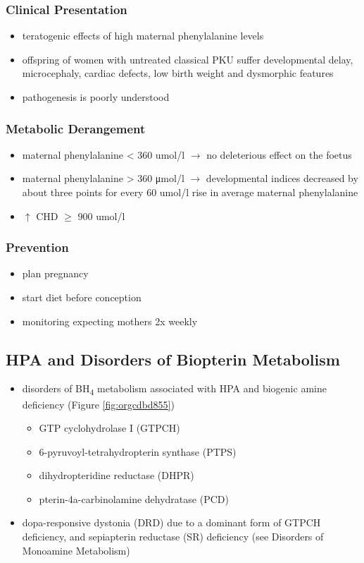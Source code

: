 \documentclass[12pt]{scrartcl}
\begin{document}
\subsubsection{Clinical Presentation}
\label{sec:org3af2017}
\begin{itemize}
\item teratogenic effects of high maternal phenylalanine levels
\item offspring of women with untreated classical PKU suffer developmental
delay, microcephaly, cardiac defects, low birth weight and
dysmorphic features
\item pathogenesis is poorly understood
\end{itemize}
\subsubsection{Metabolic Derangement}
\label{sec:orga8e6be4}
\begin{itemize}
\item maternal phenylalanine \textless{} 360 umol/l \(\to\) no deleterious effect on the foetus
\item maternal phenylalanine \textgreater{} 360 μmol/l \(\to\) developmental indices
decreased by about three points for every 60 umol/l rise in average
maternal phenylalanine
\item \(\uparrow\) CHD \(\ge\) 900 umol/l
\end{itemize}
\subsubsection{Prevention}
\label{sec:orgc12461e}
\begin{itemize}
\item plan pregnancy
\item start diet before conception
\item monitoring expecting mothers 2x weekly
\end{itemize}

\subsection{HPA and Disorders of Biopterin Metabolism}
\label{sec:org53fae1f}
\begin{itemize}
\item disorders of BH\textsubscript{4} metabolism associated with HPA and biogenic amine deficiency (Figure \ref{fig:orgcdbd855})
\begin{itemize}
\item GTP cyclohydrolase I (GTPCH)
\item 6-pyruvoyl-tetrahydropterin synthase (PTPS)
\item dihydropteridine reductase (DHPR)
\item pterin-4a-carbinolamine dehydratase (PCD)
\end{itemize}
\item dopa-responsive dystonia (DRD) due to a dominant form of GTPCH
deficiency, and sepiapterin reductase (SR) deficiency (see Disorders of Monoamine Metabolism)
\end{itemize}
\end{document}
